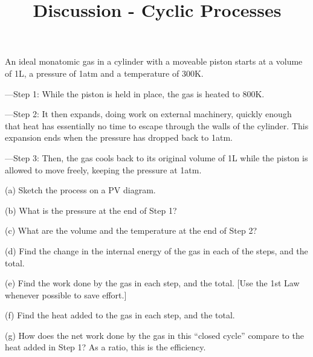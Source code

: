 \documentclass[10pt]{article}
\newenvironment{problem}[2][Problem]{\begin{trivlist}
\item[\hskip \labelsep {\bfseries #1}\hskip \labelsep {\bfseries #2.}]}{\end{trivlist}}
\begin{document}
 \title{Discussion - Cyclic Processes}
\date{}
\maketitle

\begin{problem}{1}
An ideal monatomic gas in a cylinder with a moveable piston starts at a volume of 1L, a pressure of 1atm and a
temperature of 300K.
\item ---Step 1: While the piston is held in place, the gas is heated to 800K.
\item ---Step 2: It then expands, doing work on external machinery, quickly enough that heat has essentially no time to escape through the walls of the cylinder. This expansion ends when the pressure has dropped back to 1atm.
\item ---Step 3: Then, the gas cools back to its original volume of 1L while the piston is allowed to move freely, keeping the pressure at 1atm.
\item (a) Sketch the process on a PV diagram.
\item (b) What is the pressure at the end of Step 1?
\item (c) What are the volume and the temperature at the end of Step 2?
\item (d) Find the change in the internal energy of the gas in each of the steps, and the total.
\item (e) Find the work done by the gas in each step, and the total. [Use the 1st Law whenever possible to save effort.]
\item (f) Find the heat added to the gas in each step, and the total.
\item (g) How does the net work done by the gas in this “closed cycle” compare to the heat added in Step 1? As a ratio, this is the efficiency.
\end{problem}








\end{document}
